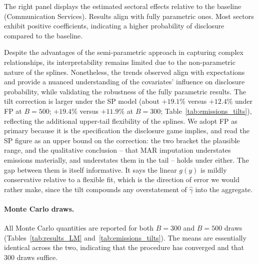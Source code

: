 \documentclass[a4paper,12pt]{article}
\begin{document}
The right panel displays the estimated sectoral effects relative to the baseline (Communication Services). Results align with fully parametric ones. Most sectors exhibit positive coefficients, indicating a higher probability of disclosure compared to the baseline. 

Despite the advantages of the semi-parametric approach in capturing complex relationships, its interpretability remains limited due to the non-parametric nature of the splines. Nonetheless, the trends observed align with expectations and provide a nuanced understanding of the covariates' influence on disclosure probability, while validating the robustness of the fully parametric results. The tilt correction is larger under the SP model (about $+19.1\%$ versus $+12.4\%$ under FP at $B=500$; $+19.4\%$ versus $+11.9\%$ at $B=300$; Table~\ref{tab:emissions_tilts}), reflecting the additional upper-tail flexibility of the splines. We adopt FP as primary because it is the specification the disclosure game implies, and read the SP figure as an upper bound on the correction: the two bracket the plausible range, and the qualitative conclusion -- that MAR imputation understates emissions materially, and understates them in the tail -- holds under either. The gap between them is itself informative. It says the linear $g(y)$ is mildly conservative relative to a flexible fit, which is the direction of error we would rather make, since the tilt compounds any overstatement of $\hat\gamma$ into the aggregate.

\paragraph{Monte Carlo draws.} All Monte Carlo quantities are reported for both $B = 300$ and $B = 500$ draws (Tables~\ref{tab:results_LM} and~\ref{tab:emissions_tilts}). The means are essentially identical across the two, indicating that the procedure has converged and that $300$ draws suffice.
\end{document}

